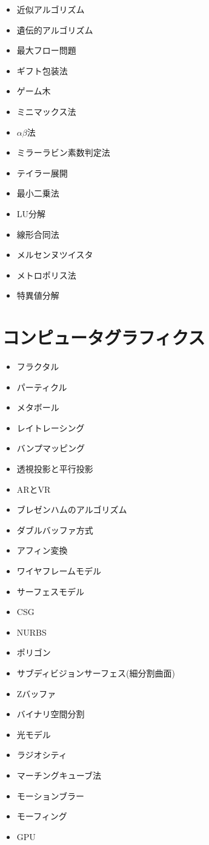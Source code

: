 \documentclass[a4j, titlepage, 11pt]{jsarticle}
\begin{document}
\begin{multicols}{2}
\begin{itemize}
	\item 近似アルゴリズム
	\item 遺伝的アルゴリズム
	\item 最大フロー問題
	\item ギフト包装法
	\item ゲーム木
	\item ミニマックス法	
	\item $\alpha \beta$法
	\item ミラーラビン素数判定法
	\item テイラー展開
	\item 最小二乗法
	\item LU分解
	\item 線形合同法
	\item メルセンヌツイスタ
	\item メトロポリス法
	\item 特異値分解
\end{itemize}
\end{multicols}

\section{コンピュータグラフィクス}
\begin{multicols}{2}
\begin{itemize}
	\item フラクタル
	\item パーティクル
	\item メタボール
	\item レイトレーシング
	\item バンプマッピング
	\item 透視投影と平行投影
	\item ARとVR
	\item ブレゼンハムのアルゴリズム
	\item ダブルバッファ方式
	\item アフィン変換
	\item ワイヤフレームモデル
	\item サーフェスモデル
	\item CSG
	\item NURBS
	\item ポリゴン
	\item サブディビジョンサーフェス(細分割曲面)
	\item Zバッファ
	\item バイナリ空間分割
	\item 光モデル
	\item ラジオシティ
	\item マーチングキューブ法
	\item モーションブラー
	\item モーフィング
	\item GPU
\end{itemize}
\end{multicols}
\end{document}
